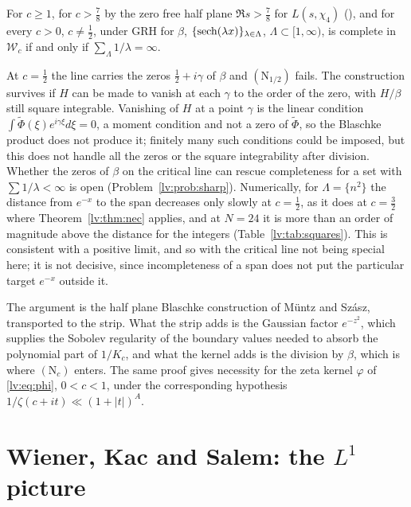 \begin{corollary}\label{lv:cor:iff}
For $c\ge1$, for $c>\frac78$ by the zero free half plane $\Re s>\frac78$ for $L(s,\chi_4)$ (\cite{OAI26a}), and for every $c>0$, $c\ne\frac12$, under GRH for $\beta$, $\{\operatorname{sech}(\lambda x)\}_{\lambda\in\Lambda}$, $\Lambda\subset[1,\infty)$, is complete in $\mathcal W_c$ if and only if $\sum_\Lambda1/\lambda=\infty$.
\end{corollary}

\begin{remark}[the barrier $c=\frac12$]\label{lv:rem:barrier}
At $c=\frac12$ the line carries the zeros $\frac12+i\gamma$ of $\beta$ and $(\mathrm N_{1/2})$ fails. The construction survives if $H$ can be made to vanish at each $\gamma$ to the order of the zero, with $H/\beta$ still square integrable. Vanishing of $H$ at a point $\gamma$ is the linear condition $\int\widetilde\Phi(\xi)e^{i\gamma\xi}d\xi=0$, a moment condition and not a zero of $\widetilde\Phi$, so the Blaschke product does not produce it; finitely many such conditions could be imposed, but this does not handle all the zeros or the square integrability after division. Whether the zeros of $\beta$ on the critical line can rescue completeness for a set with $\sum1/\lambda<\infty$ is open (Problem~\ref{lv:prob:sharp}). Numerically, for $\Lambda=\{n^2\}$ the distance from $e^{-x}$ to the span decreases only slowly at $c=\frac12$, as it does at $c=\frac32$ where Theorem~\ref{lv:thm:nec} applies, and at $N=24$ it is more than an order of magnitude above the distance for the integers (Table~\ref{lv:tab:squares}). This is consistent with a positive limit, and so with the critical line not being special here; it is not decisive, since incompleteness of a span does not put the particular target $e^{-x}$ outside it.
\end{remark}

\begin{remark}
The argument is the half plane Blaschke construction of M\"untz and Sz\'asz, transported to the strip. What the strip adds is the Gaussian factor $e^{-z^2}$, which supplies the Sobolev regularity of the boundary values needed to absorb the polynomial part of $1/K_c$, and what the kernel adds is the division by $\beta$, which is where $(\mathrm N_c)$ enters. The same proof gives necessity for the zeta kernel $\varphi$ of \eqref{lv:eq:phi}, $0<c<1$, under the corresponding hypothesis $1/\zeta(c+it)\ll(1+|t|)^A$.
\end{remark}

\section{Wiener, Kac and Salem: the $L^1$ picture}\label{lv:sec:salem}

